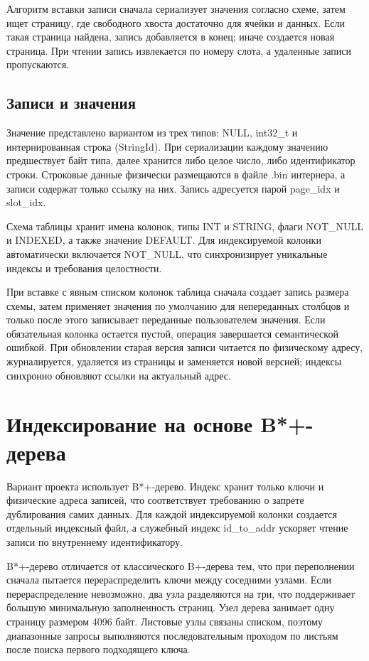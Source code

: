 \documentclass[a4paper,14pt]{extarticle}
\renewcommand{\texttt}[1]{\textrm{#1}}
\begin{document}
Алгоритм вставки записи сначала сериализует значения согласно схеме, затем ищет страницу, где свободного хвоста достаточно для ячейки и данных. Если такая страница найдена, запись добавляется в конец; иначе создается новая страница. При чтении запись извлекается по номеру слота, а удаленные записи пропускаются.

\subsection{Записи и значения}

Значение представлено вариантом из трех типов: \texttt{NULL}, \texttt{int32\_t} и интернированная строка (\texttt{StringId}). При сериализации каждому значению предшествует байт типа, далее хранится либо целое число, либо идентификатор строки. Строковые данные физически размещаются в файле \texttt{.bin} интернера, а записи содержат только ссылку на них. Запись адресуется парой \texttt{page\_idx} и \texttt{slot\_idx}.

Схема таблицы хранит имена колонок, типы \texttt{INT} и \texttt{STRING}, флаги \texttt{NOT\_NULL} и \texttt{INDEXED}, а также значение \texttt{DEFAULT}. Для индексируемой колонки автоматически включается \texttt{NOT\_NULL}, что синхронизирует уникальные индексы и требования целостности.

При вставке с явным списком колонок таблица сначала создает запись размера схемы, затем применяет значения по умолчанию для непереданных столбцов и только после этого записывает переданные пользователем значения. Если обязательная колонка остается пустой, операция завершается семантической ошибкой. При обновлении старая версия записи читается по физическому адресу, журналируется, удаляется из страницы и заменяется новой версией; индексы синхронно обновляют ссылки на актуальный адрес.

\section{Индексирование на основе B*+-дерева}

Вариант проекта использует B*+-дерево. Индекс хранит только ключи и физические адреса записей, что соответствует требованию о запрете дублирования самих данных. Для каждой индексируемой колонки создается отдельный индексный файл, а служебный индекс \texttt{id\_to\_addr} ускоряет чтение записи по внутреннему идентификатору.

B*+-дерево отличается от классического B+-дерева тем, что при переполнении сначала пытается перераспределить ключи между соседними узлами. Если перераспределение невозможно, два узла разделяются на три, что поддерживает большую минимальную заполненность страниц. Узел дерева занимает одну страницу размером 4096 байт. Листовые узлы связаны списком, поэтому диапазонные запросы выполняются последовательным проходом по листьям после поиска первого подходящего ключа.
\end{document}
